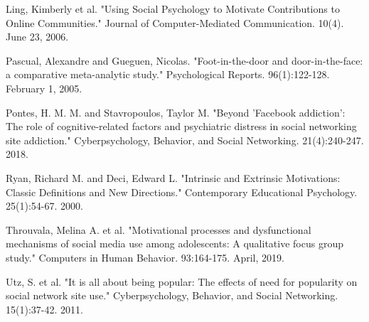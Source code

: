 \documentclass[class=book, crop=false]{standalone}
\begin{document}
Ling, Kimberly et al. "Using Social Psychology to Motivate Contributions to Online Communities." Journal of Computer-Mediated Communication. 10(4). June 23, 2006.

Pascual, Alexandre and Gueguen, Nicolas. "Foot-in-the-door and door-in-the-face: a comparative meta-analytic study." Psychological Reports. 96(1):122-128. February 1, 2005.

Pontes, H. M. M. and Stavropoulos, Taylor M. "Beyond 'Facebook addiction': The role of cognitive-related factors and psychiatric distress in social networking site addiction." Cyberpsychology, Behavior, and Social Networking. 21(4):240-247. 2018.

Ryan, Richard M. and Deci, Edward L. "Intrinsic and Extrinsic Motivations: Classic Definitions and New Directions." Contemporary Educational Psychology. 25(1):54-67. 2000.

Throuvala, Melina A. et al. "Motivational processes and dysfunctional mechanisms of social media use among adolescents: A qualitative focus group study." Computers in Human Behavior. 93:164-175. April, 2019.

Utz, S. et al. "It is all about being popular: The effects of need for popularity on social network site use." Cyberpsychology, Behavior, and Social Networking. 15(1):37-42. 2011.
\end{document}
